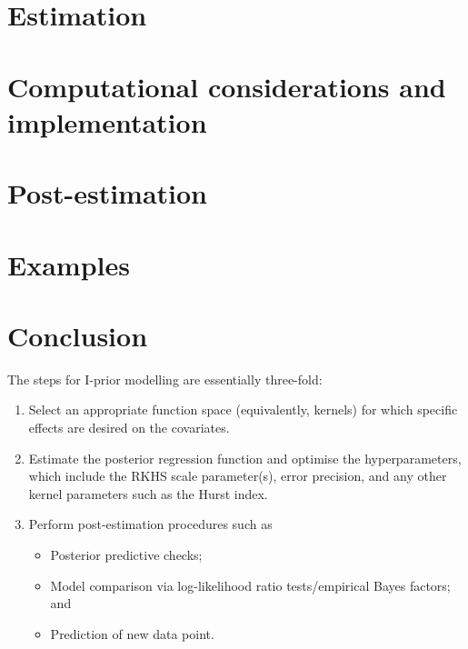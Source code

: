 \documentclass[showframe,11pt,twoside,openright]{report}
\begin{document}
\section{Estimation}
\label{sec:ipriorestimation}


\section{Computational considerations and implementation}
\label{sec:ipriorcompcons}


\section{Post-estimation}
\label{sec:ipriorpostest}


\section{Examples}\label{sec:ipriorexamples}

\section{Conclusion}

The steps for I-prior modelling are essentially three-fold:
\begin{enumerate}
  \item Select an appropriate function space (equivalently, kernels) for which specific effects are desired on the covariates. 
  \item Estimate the posterior regression function and optimise the hyperparameters, which include the RKHS scale parameter(s), error precision, and any other kernel parameters such as the Hurst index.
  \item Perform post-estimation procedures such as
  \begin{itemize}
    \item Posterior predictive checks;
    \item Model comparison via log-likelihood ratio tests/empirical Bayes factors; and
    \item Prediction of new data point.
  \end{itemize}
\end{enumerate}
\end{document}

